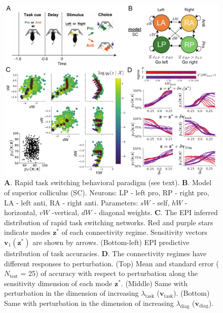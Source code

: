 \documentclass[11pt]{article}
\begin{document}
\begin{figure}
\begin{center}
\includegraphics[scale=0.8]{figures/fig4/fig4.pdf}
\end{center}
\caption{\footnotesize 
\textbf{A}. Rapid task switching behavioral paradigm (see text). 
\textbf{B}. Model of superior colliculus (SC). Neurons: LP - left pro, RP - right pro, LA - left anti, RA - right anti. 
Parameters: $sW$ - self, $hW$ - horizontal, $vW$ -vertical, $dW$ - diagonal weights.  
\textbf{C}. The EPI inferred distribution of rapid task switching networks.  
Red and purple stars indicate modes $\mathbf{z}^*$ of each connectivity regime.
Sensitivity vectors $\mathbf{v}_1(\mathbf{z}^*)$ are shown by arrows.
(Bottom-left) EPI predictive distribution of task accuracies.
\textbf{D}. The connectivity regimes have different responses to perturbation.
(Top) Mean and standard error ($N_{\text{test}}$ = 25) of accuracy with respect to perturbation along the sensitivity dimension of each mode $\mathbf{z}^*$.
(Middle) Same with perturbation in the dimension of increasing $\lambda_{\text{task}}$ ($\mathbf{v}_{\text{task}}$).
(Bottom) Same with perturbation in the dimension of increasing $\lambda_{\text{diag}}$ ($\mathbf{v}_{\text{diag}}$).
}
\label{fig:SC}
\end{figure}
\end{document}
